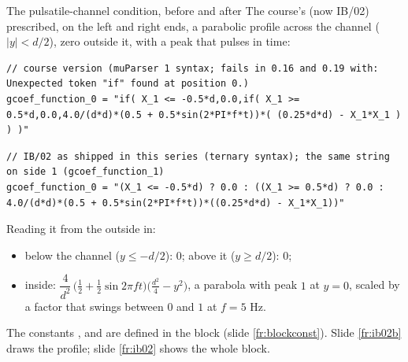 \documentclass[aspectratio=169,11pt]{beamer}
\begin{document}
\begin{frame}[fragile]{The pulsatile-channel condition, before and after}
\label{fr:pulsexpr}
\small The course's  (now IB/02) prescribed, on the left and right ends, a parabolic profile across the channel ($|y| < d/2$), zero outside it, with a peak that pulses in time:
\begin{lstlisting}[style=inputtiny]
// course version (muParser 1 syntax; fails in 0.16 and 0.19 with: Unexpected token "if" found at position 0.)
gcoef_function_0 = "if( X_1 <= -0.5*d,0.0,if( X_1 >= 0.5*d,0.0,4.0/(d*d)*(0.5 + 0.5*sin(2*PI*f*t))*( (0.25*d*d) - X_1*X_1 ) ) )"
\end{lstlisting}
\begin{lstlisting}[style=inputtiny]
// IB/02 as shipped in this series (ternary syntax); the same string on side 1 (gcoef_function_1)
gcoef_function_0 = "(X_1 <= -0.5*d) ? 0.0 : ((X_1 >= 0.5*d) ? 0.0 : 4.0/(d*d)*(0.5 + 0.5*sin(2*PI*f*t))*((0.25*d*d) - X_1*X_1))"
\end{lstlisting}
\small Reading it from the outside in:
\begin{itemize}
  \item below the channel ($y \le -d/2$): $0$; above it ($y \ge d/2$): $0$;
  \item inside: $\dfrac{4}{d^2}\,\bigl(\tfrac12 + \tfrac12\sin 2\pi f t\bigr)\bigl(\tfrac{d^2}{4} - y^2\bigr)$, a parabola with peak $1$ at $y = 0$, scaled by a factor that swings between $0$ and $1$ at $f = 5$ Hz.
\end{itemize}
\small The constants ,  and  are defined in the block (slide \ref{fr:blockconst}). Slide \ref{fr:ib02b} draws the profile; slide \ref{fr:ib02} shows the whole block.
\end{frame}
\end{document}
